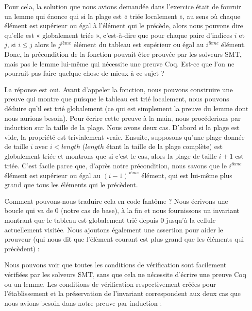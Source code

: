 

Pour cela, la solution que nous avions demandée dans l'exercice était de fournir
un lemme qui énonce qui si la plage est « triée localement », au sens où chaque
élément est supérieur ou égal à l'élément qui le précède, alors nous pouvons
dire qu'elle est « globalement triée », c'est-à-dire que pour chaque paire
d'indices $i$ et $j$, si $i \leq j$ alors le $j^{ième}$ élément du tableau est
supérieur ou égal au $i^{ième}$ élément. Donc, la précondition de la fonction
pouvait être prouvée par les solveurs SMT, mais pas le lemme lui-même qui
nécessite une preuve Coq. Est-ce que l'on ne pourrait pas faire quelque chose
de mieux à ce sujet ?


La réponse est oui. Avant d'appeler la fonction, nous pouvons construire une
preuve qui montre que puisque le tableau est trié localement, nous pouvons
déduire qu'il est trié globalement (ce qui est simplement la preuve du lemme
dont nous aurions besoin). Pour écrire cette preuve à la main, nous procéderions
par induction sur la taille de la plage. Nous avons deux cas. D'abord si la
plage est vide, la propriété est trivialement vraie. Ensuite, supposons qu'une
plage donnée de taille $i$ avec $i < length$ ($length$ étant la taille de la
plage complète) est globalement triée et montrons que si c'est le cas, alors la
plage de taille $i+1$ est triée. C'est facile parce que, d'après notre
précondition, nous savons que le $i^{ième}$ élément est supérieur ou égal au
$(i-1)^{ième}$ élément, qui est lui-même plus grand que tous les éléments qui
le précèdent.


Comment pouvons-nous traduire cela en code fantôme ? Nous écrivons une boucle qui
va de $0$ (notre cas de base), à la fin  et nous fournissons
un invariant montrant que le tableau est globalement trié depuis $0$ jusqu'à la
cellule actuellement visitée. Nous ajoutons également une assertion pour aider le
prouveur (qui nous dit que l'élément courant est plus grand que les éléments qui
précèdent) :






Nous pouvons voir que toutes les conditions de vérification sont facilement
vérifiées par les solveurs SMT, sans que cela ne nécessite d'écrire une preuve Coq
ou un lemme. Les conditions de vérification respectivement créées pour
l'établissement et la préservation de l'invariant correspondent aux deux cas que
nous avions besoin dans notre preuve par induction :


